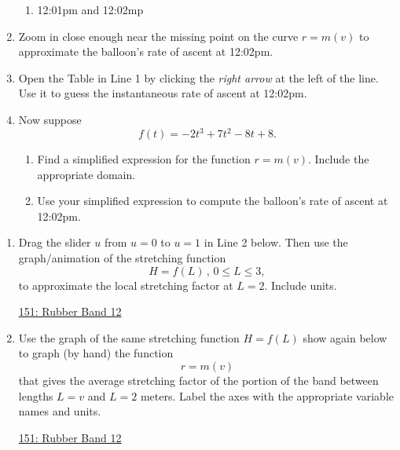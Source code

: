 \documentclass{ximera}
\begin{document}
\begin{question}
\begin{enumerate}
\begin{enumerate}
\item 12:01pm and 12:02mp
\end{enumerate}

\item Zoom in close enough near the missing point on the curve $r=m(v)$ to approximate the balloon's rate of ascent at 12:02pm.

\item Open the Table in Line 1 by clicking the \emph{right arrow} at the left of the line. Use it to guess the instantaneous rate of ascent at 12:02pm.

\item Now suppose
\[
   f(t) = -2t^3+7t^2-8t+8 .
\]

\begin{enumerate}
\item Find a simplified expression for the function $r=m(v)$. Include the appropriate domain.

\item Use your simplified expression to compute the balloon's rate of ascent at 12:02pm.
\end{enumerate}

\end{enumerate}
\end{question}

\begin{question}  \label{Qdfsa4555}

\begin{enumerate}

\item Drag the slider $u$ from $u=0$ to $u=1$ in Line 2 below. Then use the graph/animation of the stretching function
\[
   H = f(L) \, , \, 0\leq L \leq 3 ,
\]
to approximate the local stretching factor at $L=2$. Include units. 

\begin{onlineOnly}
    \begin{center}
\end{center}
\end{onlineOnly}

\href{https://www.desmos.com/calculator/boubpczsne}{151: Rubber Band 12}

\item Use the graph of the same stretching function $H=f(L)$ show again below to graph (by hand) the function
\[
    r = m(v)
\]
that gives the average stretching factor of the portion of the band between lengths $L=v$ and $L=2$ meters. Label the axes with the appropriate variable names and units.

\begin{onlineOnly}
    \begin{center}
\end{center}
\end{onlineOnly}

\href{https://www.desmos.com/calculator/vss7ofbwii}{151: Rubber Band 12}




\end{enumerate}


\end{question}
\end{document}

